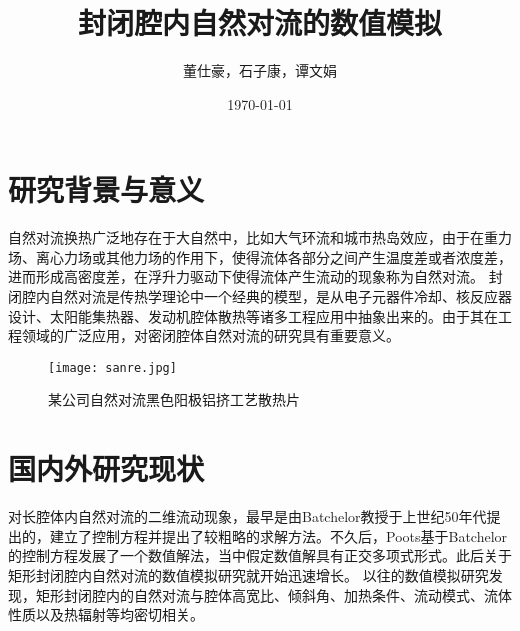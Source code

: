 \documentclass[UTF8]{article} %
\title{封闭腔内自然对流的数值模拟}  %
\author{董仕豪，石子康，谭文娟}   %
\date{\today}       %
\begin{document}
\maketitle          %
\tableofcontents

\newpage

\section{研究背景与意义}
自然对流换热广泛地存在于大自然中，比如大气环流和城市热岛效应，由于在重力场、离心力场或其他力场的作用下，使得流体各部分之间产生温度差或者浓度差，进而形成高密度差，在浮升力驱动下使得流体产生流动的现象称为自然对流。
封闭腔内自然对流是传热学理论中一个经典的模型，是从电子元器件冷却、核反应器设计、太阳能集热器、发动机腔体散热等诸多工程应用中抽象出来的。由于其在工程领域的广泛应用，对密闭腔体自然对流的研究具有重要意义。

\begin{figure}[h]
  \centering
  \texttt{[image: sanre.jpg]}
  \caption{某公司自然对流黑色阳极铝挤工艺散热片}
  \label{fig:sanre}
\end{figure}

\section{国内外研究现状}
对长腔体内自然对流的二维流动现象，最早是由Batchelor\cite{RN1}教授于上世纪50年代提出的，建立了控制方程并提出了较粗略的求解方法。不久后，Poots\cite{RN2}基于Batchelor的控制方程发展了一个数值解法，当中假定数值解具有正交多项式形式。此后关于矩形封闭腔内自然对流的数值模拟研究就开始迅速增长。
以往的数值模拟研究发现，矩形封闭腔内的自然对流与腔体高宽比、倾斜角、加热条件、流动模式、流体性质以及热辐射等均密切相关。
\end{document}
